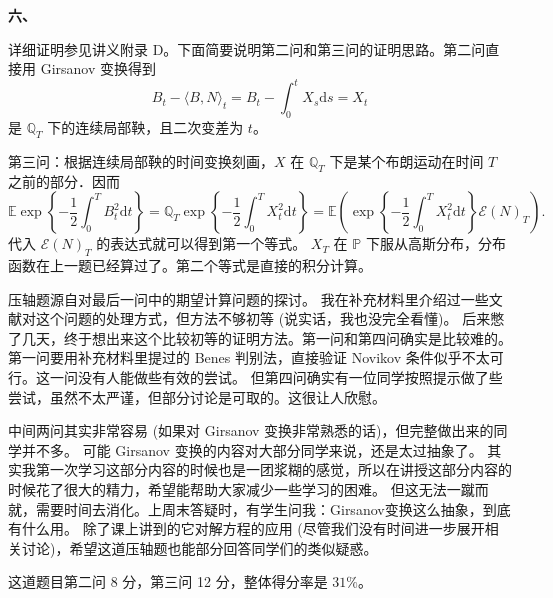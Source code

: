     \textbf{六、}

    详细证明参见讲义附录 D。下面简要说明第二问和第三问的证明思路。第二问直接用 Girsanov 变换得到
    $$B_{t}-\langle B, N\rangle_{t}=B_{t}-\int_{0}^{t} X_{s} \mathrm{d} s=X_{t}$$
    是 $\mathbb{Q}_{T}$ 下的连续局部鞅，且二次变差为 $t$。

    第三问：根据连续局部鞅的时间变换刻画，$X$ 在 $\mathbb{Q}_{T}$ 下是某个布朗运动在时间 $T$ 之前的部分．因而
    $$\mathbb{E} \exp \left\{-\frac{1}{2} \int_{0}^{T} B_{t}^{2} \mathrm{d} t\right\}
    =\mathbb{Q}_{T} \exp \left\{-\frac{1}{2} \int_{0}^{T} X_{t}^{2} \mathrm{d} t\right\}
    =\mathbb{E}\left(\exp \left\{-\frac{1}{2} \int_{0}^{T} X_{t}^{2} \mathrm{d} t\right\} \mathscr{E}(N)_{T}\right).$$
    代入 $\mathscr{E}(N)_{T}$ 的表达式就可以得到第一个等式。
    $X_{T}$ 在 $\mathbb{P}$ 下服从高斯分布，分布函数在上一题已经算过了。第二个等式是直接的积分计算。

    \textcolor{0000cc}{\qquad 压轴题源自对最后一问中的期望计算问题的探讨。
    我在补充材料里介绍过一些文献对这个问题的处理方式，但方法不够初等 (说实话，我也没完全看懂)。
    后来憋了几天，终于想出来这个比较初等的证明方法。第一问和第四问确实是比较难的。
    第一问要用补充材料里提过的 Benes 判别法，直接验证 Novikov 条件似乎不太可行。这一问没有人能做些有效的尝试。
    但第四问确实有一位同学按照提示做了些尝试，虽然不太严谨，但部分讨论是可取的。这很让人欣慰。

    \qquad 中间两问其实非常容易 (如果对 Girsanov 变换非常熟悉的话)，但完整做出来的同学并不多。
    可能 Girsanov 变换的内容对大部分同学来说，还是太过抽象了。
    其实我第一次学习这部分内容的时候也是一团浆糊的感觉，所以在讲授这部分内容的时候花了很大的精力，希望能帮助大家减少一些学习的困难。
    但这无法一蹴而就，需要时间去消化。上周末答疑时，有学生问我：Girsanov变换这么抽象，到底有什么用。
    除了课上讲到的它对解方程的应用 (尽管我们没有时间进一步展开相关讨论)，希望这道压轴题也能部分回答同学们的类似疑惑。

    \qquad 这道题目第二问 8 分，第三问 12 分，整体得分率是 $31 \%$。}